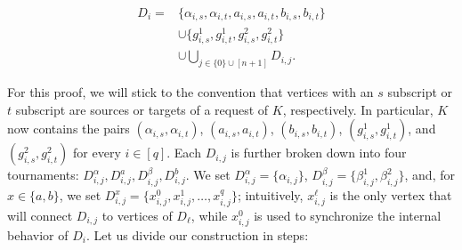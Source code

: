 \documentclass[a4paper,UKenglish,cleveref, autoref, thm-restate]{lipics-v2021}
\begin{document}
\begin{align*}
  D_i = &\{\alpha_{i,s}, \alpha_{i,t}, a_{i,s}, a_{i,t}, b_{i,s},  b_{i,t}\}\\
  &\cup \{g^1_{i, s}, g^1_{i, t}, g^2_{i, s}, g^2_{i, t}\}\\
  &\cup \bigcup_{j \in \{0\} \cup [n+1]} D_{i,j}.
\end{align*}

For this proof, we will stick to the convention that vertices with an $s$ subscript or
$t$ subscript are sources or targets of a request of $K$, respectively.
In particular, $K$ now contains the pairs $(\alpha_{i,s}, \alpha_{i,t})$, $(a_{i,s}, a_{i,t})$,
$(b_{i,s}, b_{i,t})$, $(g^1_{i, s}, g^1_{i, t})$, and $(g^2_{i, s}, g^2_{i, t})$ for
every $i \in [q]$.
Each $D_{i,j}$ is further broken down into four tournaments: $D_{i,j}^\alpha, D_{i,j}^a,
D_{i,j}^\beta, D_{i,j}^b$.
We set $D_{i,j}^\alpha = \{\alpha_{i,j}\}$, $D_{i,j}^\beta = \{\beta^1_{i,j},
\beta^2_{i,j}\}$, and, for $x \in \{a,b\}$, we set $D_{i,j}^x = \{x_{i,j}^0, x_{i,j}^1,
\dots, x_{i,j}^q\}$; intuitively, $x^\ell_{i,j}$ is the only vertex that will connect
$D_{i,j}$ to vertices of $D_\ell$, while $x^0_{i,j}$ is used to synchronize the internal
behavior of $D_i$.
Let us divide our construction in steps:
\end{document}
